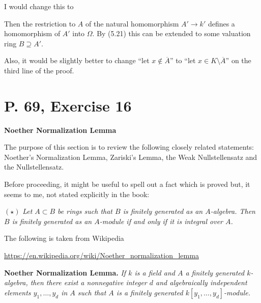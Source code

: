 \documentclass[12pt]{article}
\begin{document}
I would change this to 

Then the restriction to $A$ of the natural homomorphism $A'\to k'$ defines a homomorphism of $A'$ into $\Omega$. By (5.21) this can be extended to some valuation ring $B\supseteq A'$.

Also, it would be slightly better to change ``let $x\notin\overline A$'' to ``let $x\in K\setminus\overline A$'' on the third line of the proof.\bigskip

\section{P. 69, Exercise 16}%

\textbf{\Large Noether Normalization Lemma}

The purpose of this section is to review the following closely related statements: Noether's Normalization Lemma, Zariski's Lemma, the Weak Nullstellensatz and the Nullstellensatz.

Before proceeding, it might be useful to spell out a fact which is proved but, it seems to me, not stated explicitly in the book:

$(\star)$ \emph{Let $A\subset B$ be rings such that $B$ is finitely generated as an $A$-algebra. Then $B$ is finitely generated as an $A$-module if and only if it is integral over $A$.}

The following is taken from Wikipedia 

\href{https://en.wikipedia.org/wiki/Noether_normalization_lemma}{\small https://en.wikipedia.org/wiki/Noether\_normalization\_lemma}

\textbf{Noether Normalization Lemma.} \emph{If $k$ is a field and $A$ a finitely generated $k$-algebra, then there exist a nonnegative integer $d$ and algebraically independent elements $y_1,\dots,y_d$ in $A$ such that $A$ is a finitely generated $k[y_1,\dots,y_d]$-module.}
\end{document}
